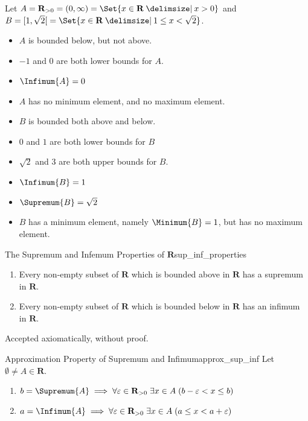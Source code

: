 \begin{Example}{}{}
    Let $ A=\mathbf{R}_{>0}=(0,\infty)=\Set{x\in\mathbf{R}\given x>0} $
    and $ B=\interval[open right]{1}{\sqrt{2}}
        =\Set{x\in\mathbf{R}\given 1\le x<\sqrt{2}} $.
    \begin{itemize}
        \item $ A $ is bounded below, but not above.
        \item $ -1 $ and $ 0 $ are both lower bounds for $ A $.
        \item $ \Infimum{A}=0 $
        \item $ A $ has no minimum element, and no maximum element.
        \item $ B $ is bounded both above and below.
        \item $ 0 $ and $ 1 $ are both lower bounds for $ B $
        \item $ \sqrt{2} $ and $ 3 $ are both upper bounds for $ B $.
        \item $ \Infimum{B}=1 $
        \item $ \Supremum{B}=\sqrt{2} $
        \item $ B $ has a minimum element, namely $ \Minimum{B}=1 $,
              but has no maximum element.
    \end{itemize}
\end{Example}
\begin{Theorem}{The Supremum and Infemum Properties of $ \mathbf{R} $}{sup_inf_properties}
    \begin{enumerate}[label=(\arabic*)]
        \item\label{sup_inf_properties_1}Every non-empty subset of $ \mathbf{R} $
              which is bounded above in $ \mathbf{R} $ has a supremum in $ \mathbf{R} $.
        \item\label{sup_inf_properties_2}Every non-empty subset of $ \mathbf{R} $
              which is bounded below in $ \mathbf{R} $ has an infimum in $ \mathbf{R} $.
    \end{enumerate}
\end{Theorem}
\begin{Proof}{}{}
    Accepted axiomatically, without proof.
\end{Proof}
\begin{Theorem}{Approximation Property of Supremum and Infimum}{approx_sup_inf}
    Let $ \emptyset\neq A\in\mathbf{R} $.
    \begin{enumerate}[label=(\arabic*)]
        \item\label{approx_sup_inf_1}$ b=\Supremum{A}\implies \forall \varepsilon\in\mathbf{R}_{>0}\;
                  \exists x\in A\;(b-\varepsilon<x\le b) $
        \item $ a=\Infimum{A}\implies \forall \varepsilon\in\mathbf{R}_{>0}\;
                  \exists x\in A\;(a\le x<a+\varepsilon) $
    \end{enumerate}
\end{Theorem}
